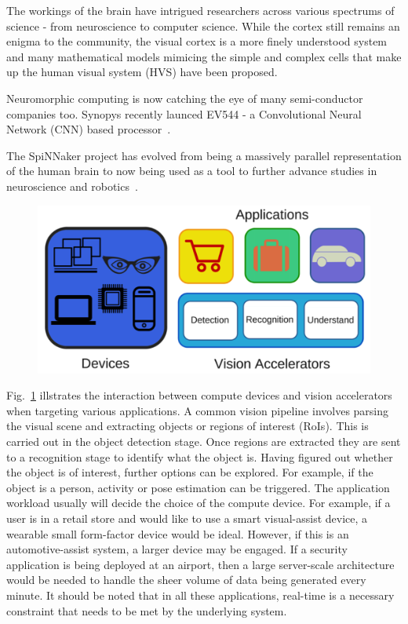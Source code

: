 The workings of the brain have intrigued researchers across various spectrums of science - from neuroscience to computer science. While the cortex still remains 
an enigma to the community, the visual cortex is a more finely understood system and many mathematical models mimicing the simple and complex cells that make up the 
human visual system (HVS) have been proposed.

Neuromorphic computing is now catching the eye of many semi-conductor companies too. Synopys recently launced 
EV544 - a Convolutional Neural Network (CNN) based processor~\cite{syncnn}.

The SpiNNaker project has evolved from being a massively parallel representation of the human brain to now being used as a tool to further advance studies in 
neuroscience and robotics~\cite{spinnaker}.

\begin{figure}[!htb]
\vspace{0pt}
\centering
\includegraphics[width=0.9\linewidth]{./figures/vision_apps_devices.png}
\vspace{0pt}
\caption{}
\label{fig:iot}
\vspace{0pt}
\end{figure}

Fig.~\ref{fig:iot} illstrates the interaction between compute devices and vision accelerators when targeting various applications. A common vision pipeline involves parsing the visual scene and extracting objects or regions of interest (RoIs). This is 
carried out in the object detection stage. Once regions are extracted they are sent to a recognition stage to identify 
what the object is. Having figured out whether the object is of interest, further options can be explored. For example, if the 
object is a person, activity or pose estimation can be triggered. The application workload usually will decide the choice of 
the compute device. For example, if a user is in a retail store and would like to use a smart visual-assist device, a 
wearable small form-factor device would be ideal. However, if this is an automotive-assist system, a larger device may be 
engaged. If a security application is being deployed at an airport, then a large server-scale architecture would be needed to
handle the sheer volume of data being generated every minute. It should be noted that in all these applications, real-time is a necessary constraint that needs to be met by the underlying system.

